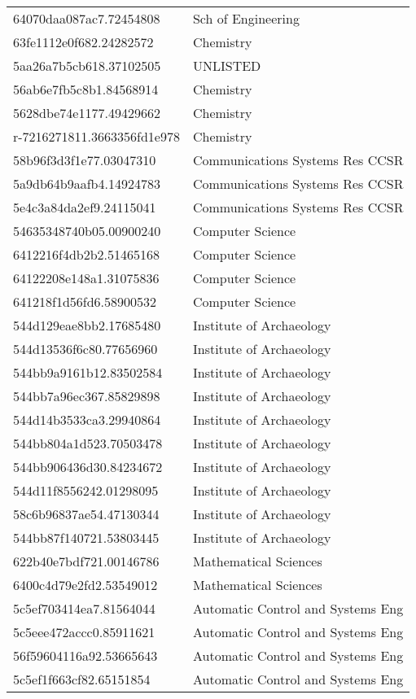 \begin{tabular}{ll}
64070daa087ac7.72454808 & Sch of Engineering \\
63fe1112e0f682.24282572 & Chemistry \\
5aa26a7b5cb618.37102505 & UNLISTED \\
56ab6e7fb5c8b1.84568914 & Chemistry \\
5628dbe74e1177.49429662 & Chemistry \\
r-7216271811.3663356fd1e978 & Chemistry \\
58b96f3d3f1e77.03047310 & Communications Systems Res CCSR \\
5a9db64b9aafb4.14924783 & Communications Systems Res CCSR \\
5e4c3a84da2ef9.24115041 & Communications Systems Res CCSR \\
54635348740b05.00900240 & Computer Science \\
6412216f4db2b2.51465168 & Computer Science \\
64122208e148a1.31075836 & Computer Science \\
641218f1d56fd6.58900532 & Computer Science \\
544d129eae8bb2.17685480 & Institute of Archaeology \\
544d13536f6c80.77656960 & Institute of Archaeology \\
544bb9a9161b12.83502584 & Institute of Archaeology \\
544bb7a96ec367.85829898 & Institute of Archaeology \\
544d14b3533ca3.29940864 & Institute of Archaeology \\
544bb804a1d523.70503478 & Institute of Archaeology \\
544bb906436d30.84234672 & Institute of Archaeology \\
544d11f8556242.01298095 & Institute of Archaeology \\
58c6b96837ae54.47130344 & Institute of Archaeology \\
544bb87f140721.53803445 & Institute of Archaeology \\
622b40e7bdf721.00146786 & Mathematical Sciences \\
6400c4d79e2fd2.53549012 & Mathematical Sciences \\
5c5ef703414ea7.81564044 & Automatic Control and Systems Eng \\
5c5eee472accc0.85911621 & Automatic Control and Systems Eng \\
56f59604116a92.53665643 & Automatic Control and Systems Eng \\
5c5ef1f663cf82.65151854 & Automatic Control and Systems Eng \\

\end{tabular}
